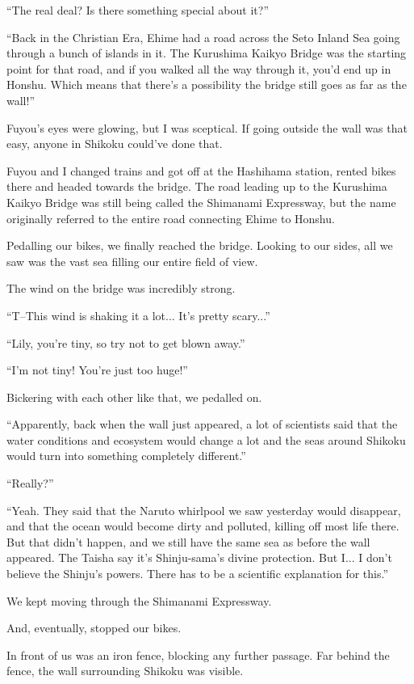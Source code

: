 ``The real deal? Is there something special about it?''

``Back in the Christian Era, Ehime had a road across the Seto Inland Sea going through a bunch of islands in it. The Kurushima Kaikyo Bridge was the starting point for that road, and if you walked all the way through it, you'd end up in Honshu. Which means that there's a possibility the bridge still goes as far as the wall!''

Fuyou's eyes were glowing, but I was sceptical. If going outside the wall was that easy, anyone in Shikoku could've done that.

Fuyou and I changed trains and got off at the Hashihama station, rented bikes there and headed towards the bridge. The road leading up to the Kurushima Kaikyo Bridge was still being called the Shimanami Expressway, but the name originally referred to the entire road connecting Ehime to Honshu.

Pedalling our bikes, we finally reached the bridge. Looking to our sides, all we saw was the vast sea filling our entire field of view.

The wind on the bridge was incredibly strong.

``T--This wind is shaking it a lot... It's pretty scary...''

``Lily, you're tiny, so try not to get blown away.''

``I'm not tiny! You're just too huge!''

Bickering with each other like that, we pedalled on.

``Apparently, back when the wall just appeared, a lot of scientists said that the water conditions and ecosystem would change a lot and the seas around Shikoku would turn into something completely different.''

``Really?''

``Yeah. They said that the Naruto whirlpool we saw yesterday would disappear, and that the ocean would become dirty and polluted, killing off most life there. But that didn't happen, and we still have the same sea as before the wall appeared. The Taisha say it's Shinju-sama's divine protection. But I... I don't believe the Shinju's powers. There has to be a scientific explanation for this.''

We kept moving through the Shimanami Expressway.

And, eventually, stopped our bikes.

In front of us was an iron fence, blocking any further passage. Far behind the fence, the wall surrounding Shikoku was visible.

